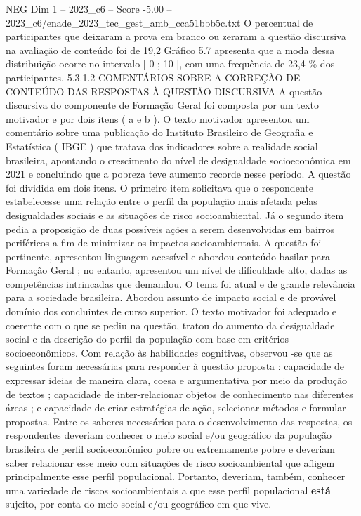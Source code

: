 \begin{textsample}{NEG Dim 1 – 2023\_c6 – Score -5.00 – 2023\_c6/enade\_2023\_tec\_gest\_amb\_cca51bbb5c.txt}
O percentual de participantes que deixaram a prova em branco ou zeraram a questão discursiva na avaliação de conteúdo foi de 19,2 Gráfico 5.7 apresenta que a moda dessa distribuição ocorre no intervalo [ 0 ; 10 ], com uma frequência de 23,4 \% dos participantes. 5.3.1.2 COMENTÁRIOS SOBRE A CORREÇÃO DE CONTEÚDO DAS RESPOSTAS À QUESTÃO DISCURSIVA A questão discursiva do componente de Formação Geral foi composta por um texto motivador e por dois itens ( a e b ).
O texto motivador apresentou um comentário sobre uma publicação do Instituto Brasileiro de Geografia e Estatística ( IBGE ) que tratava dos indicadores sobre a realidade social brasileira, apontando o crescimento do nível de desigualdade socioeconômica em 2021 e concluindo que a pobreza teve aumento recorde nesse período.
A questão foi dividida em dois itens.
O primeiro item solicitava que o respondente estabelecesse uma relação entre o perfil da população mais afetada pelas desigualdades sociais e as situações de risco socioambiental.
Já o segundo item pedia a proposição de duas possíveis ações a serem desenvolvidas em bairros periféricos a fim de minimizar os impactos socioambientais.
A questão foi pertinente, apresentou linguagem acessível e abordou conteúdo basilar para Formação Geral ; no entanto, apresentou um nível de dificuldade alto, dadas as competências intrincadas que demandou.
O tema foi atual e de grande relevância para a sociedade brasileira.
Abordou assunto de impacto social e de provável domínio dos concluintes de curso superior.
O texto motivador foi adequado e coerente com o que se pediu na questão, tratou do aumento da desigualdade social e da descrição do perfil da população com base em critérios socioeconômicos.
Com relação às habilidades cognitivas, observou -se que as seguintes foram necessárias para responder à questão proposta : capacidade de expressar ideias de maneira clara, coesa e argumentativa por meio da produção de textos ; capacidade de inter-relacionar objetos de conhecimento nas diferentes áreas ; e capacidade de criar estratégias de ação, selecionar métodos e formular propostas.
Entre os saberes necessários para o desenvolvimento das respostas, os respondentes deveriam conhecer o meio social e/ou geográfico da população brasileira de perfil socioeconômico pobre ou extremamente pobre e deveriam saber relacionar esse meio com situações de risco socioambiental que afligem principalmente esse perfil populacional.
Portanto, deveriam, também, conhecer uma variedade de riscos socioambientais a que esse perfil populacional \textbf{está} sujeito, por conta do meio social e/ou geográfico em que vive.

\end{textsample}
